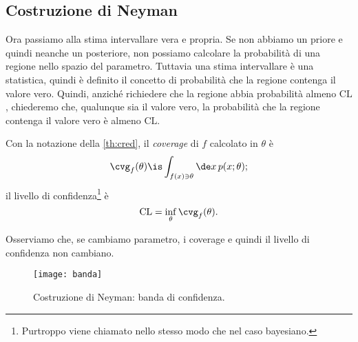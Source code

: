 
\subsection{Costruzione di Neyman}

Ora passiamo alla stima intervallare vera e propria.
Se non abbiamo un priore e quindi neanche un posteriore,
non possiamo calcolare la probabilità di una regione nello spazio del parametro.
Tuttavia una stima intervallare è una statistica,
quindi è definito il concetto di probabilità che la regione contenga il valore vero.
Quindi, anziché richiedere che la regione abbia probabilità almeno $\mathrm{CL}$,
chiederemo che,
qualunque sia il valore vero,
la probabilità che la regione contenga il valore vero è almeno $\mathrm{CL}$.

\begin{definition}[Coverage]
	Con la notazione della \autoref{th:cred},
	il \emph{coverage} di $f$ calcolato in $\theta$ è
	\begin{equation*}
		\cvg_f(\theta)
		\is \int_{f(x)\ni\theta} \de x\, p(x;\theta);
	\end{equation*}
	il livello di confidenza\footnote{Purtroppo viene chiamato nello stesso modo che nel caso bayesiano.} è
	\begin{equation*}
		\mathrm{CL}
		= \inf_\theta \cvg_f(\theta).
	\end{equation*}
\end{definition}

Osserviamo che,
se cambiamo parametro,
i coverage e quindi il livello di confidenza non cambiano.

\begin{figure}
	\centering
	\texttt{[image: banda]}
	\caption{\label{fig:neyman}%
	Costruzione di Neyman: banda di confidenza.}
\end{figure}

